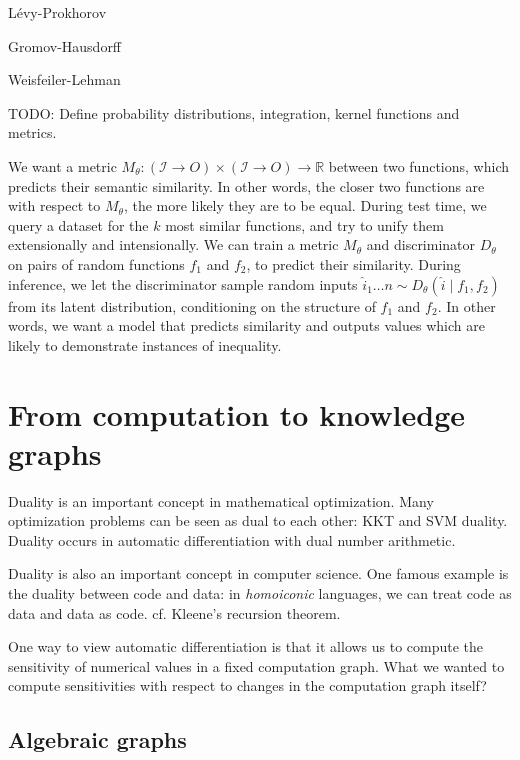 \documentclass[11pt]{article}
\begin{document}
    L\'evy-Prokhorov

    Gromov-Hausdorff

    Weisfeiler-Lehman

    TODO: Define probability distributions, integration, kernel functions and metrics.

    We want a metric $M_\theta: (\mathcal{I}\rightarrow{O}) \times (\mathcal{I}\rightarrow{O})\rightarrow \mathbb{R}$ between two functions, which predicts their semantic similarity. In other words, the closer two functions are with respect to $M_\theta$, the more likely they are to be equal. During test time, we query a dataset for the $k$ most similar functions, and try to unify them extensionally and intensionally. We can train a metric $M_\theta$ and discriminator $D_\theta$ on pairs of random functions $f_1$ and $f_2$, to predict their similarity. During inference, we let the discriminator sample random inputs $\hat i_1 \ldots n \sim D_\theta(\hat i \mid f_1, f_2)$ from its latent distribution, conditioning on the structure of $f_1$ and $f_2$. In other words, we want a model that predicts similarity and outputs values which are likely to demonstrate instances of inequality.

    \pagebreak\section{From computation to knowledge graphs}\label{sec:graphs}


    Duality is an important concept in mathematical optimization. Many optimization problems can be seen as dual to each other: KKT and SVM duality. Duality occurs in automatic differentiation with dual number arithmetic.

    Duality is also an important concept in computer science. One famous example is the duality between code and data: in \textit{homoiconic} languages, we can treat code as data and data as code. cf. Kleene's recursion theorem.

    One way to view automatic differentiation is that it allows us to compute the sensitivity of numerical values in a fixed computation graph. What we wanted to compute sensitivities with respect to changes in the computation graph itself?

    \subsection{Algebraic graphs}\label{subsec:algebraic-graphs}
\end{document}
